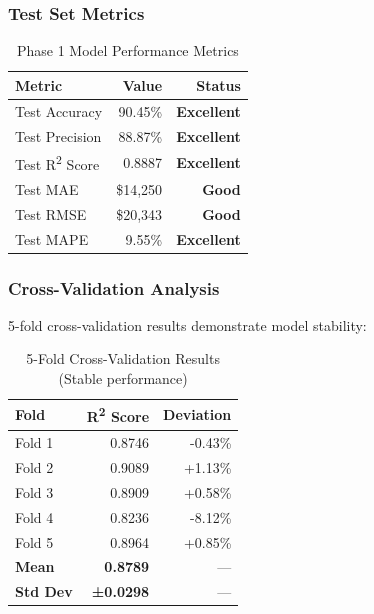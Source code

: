 \documentclass[11pt,a4paper]{article}
\begin{document}
\subsubsection{Test Set Metrics}

\begin{table}[h!]
    \centering
    \small
    \begin{tabular}{lrr}
        \toprule
        \textbf{Metric} & \textbf{Value} & \textbf{Status} \\
        \midrule
        Test Accuracy & 90.45\% & \textbf{Excellent} \\
        Test Precision & 88.87\% & \textbf{Excellent} \\
        Test R\textsuperscript{2} Score & 0.8887 & \textbf{Excellent} \\
        Test MAE & \$14,250 & \textbf{Good} \\
        Test RMSE & \$20,343 & \textbf{Good} \\
        Test MAPE & 9.55\% & \textbf{Excellent} \\
        \bottomrule
    \end{tabular}
    \caption{Phase 1 Model Performance Metrics}
\end{table}

\subsubsection{Cross-Validation Analysis}

5-fold cross-validation results demonstrate model stability:

\begin{table}[h!]
    \centering
    \small
    \begin{tabular}{lrr}
        \toprule
        \textbf{Fold} & \textbf{R\textsuperscript{2} Score} & \textbf{Deviation} \\
        \midrule
        Fold 1 & 0.8746 & -0.43\% \\
        Fold 2 & 0.9089 & +1.13\% \\
        Fold 3 & 0.8909 & +0.58\% \\
        Fold 4 & 0.8236 & -8.12\% \\
        Fold 5 & 0.8964 & +0.85\% \\
        \midrule
        \textbf{Mean} & \textbf{0.8789} & --- \\
        \textbf{Std Dev} & \textbf{±0.0298} & --- \\
        \bottomrule
    \end{tabular}
    \caption{5-Fold Cross-Validation Results (Stable performance)}
\end{table}
\end{document}
